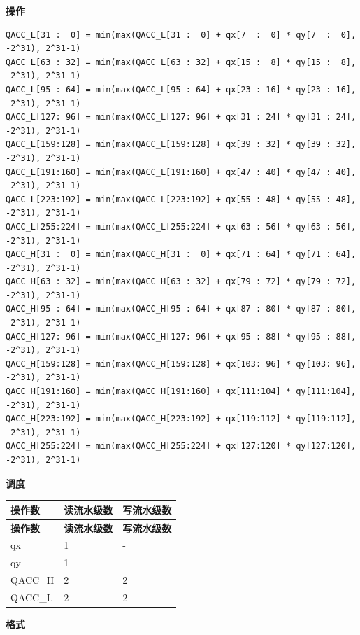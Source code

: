 \textbf{操作}\\
\begin{lstlisting}
QACC_L[31 :  0] = min(max(QACC_L[31 :  0] + qx[7  :  0] * qy[7  :  0], -2^31), 2^31-1)
QACC_L[63 : 32] = min(max(QACC_L[63 : 32] + qx[15 :  8] * qy[15 :  8], -2^31), 2^31-1)
QACC_L[95 : 64] = min(max(QACC_L[95 : 64] + qx[23 : 16] * qy[23 : 16], -2^31), 2^31-1)
QACC_L[127: 96] = min(max(QACC_L[127: 96] + qx[31 : 24] * qy[31 : 24], -2^31), 2^31-1)
QACC_L[159:128] = min(max(QACC_L[159:128] + qx[39 : 32] * qy[39 : 32], -2^31), 2^31-1)
QACC_L[191:160] = min(max(QACC_L[191:160] + qx[47 : 40] * qy[47 : 40], -2^31), 2^31-1)
QACC_L[223:192] = min(max(QACC_L[223:192] + qx[55 : 48] * qy[55 : 48], -2^31), 2^31-1)
QACC_L[255:224] = min(max(QACC_L[255:224] + qx[63 : 56] * qy[63 : 56], -2^31), 2^31-1)
QACC_H[31 :  0] = min(max(QACC_H[31 :  0] + qx[71 : 64] * qy[71 : 64], -2^31), 2^31-1)
QACC_H[63 : 32] = min(max(QACC_H[63 : 32] + qx[79 : 72] * qy[79 : 72], -2^31), 2^31-1)
QACC_H[95 : 64] = min(max(QACC_H[95 : 64] + qx[87 : 80] * qy[87 : 80], -2^31), 2^31-1)
QACC_H[127: 96] = min(max(QACC_H[127: 96] + qx[95 : 88] * qy[95 : 88], -2^31), 2^31-1)
QACC_H[159:128] = min(max(QACC_H[159:128] + qx[103: 96] * qy[103: 96], -2^31), 2^31-1)
QACC_H[191:160] = min(max(QACC_H[191:160] + qx[111:104] * qy[111:104], -2^31), 2^31-1)
QACC_H[223:192] = min(max(QACC_H[223:192] + qx[119:112] * qy[119:112], -2^31), 2^31-1)
QACC_H[255:224] = min(max(QACC_H[255:224] + qx[127:120] * qy[127:120], -2^31), 2^31-1)

\end{lstlisting}

\textbf{调度}\\
\begin{longtable}[c]{|l|l|l|}
    \hline
    \rowcolor{lightgray}
    \textbf{操作数} & \textbf{读流水级数} & \textbf{写流水级数} \\\hline
    \endfirsthead
    \hline
    \rowcolor{lightgray}
     \textbf{操作数} & \textbf{读流水级数} & \textbf{写流水级数} \\\hline
    \endhead
    \hline
    \endfoot

     qx & 1 & - \\\hline
     qy & 1 & - \\\hline
     QACC\_H & 2 & 2 \\\hline
     QACC\_L & 2 & 2

\end{longtable}

\textbf{格式}\\

